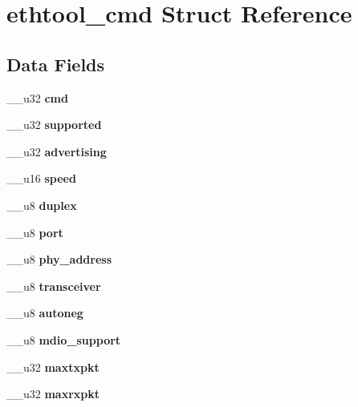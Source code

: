 \section{ethtool\-\_\-cmd \-Struct \-Reference}
\label{structethtool__cmd}
\subsection*{\-Data \-Fields}
\begin{DoxyCompactItemize}
\item 
\-\_\-\-\_\-u32 {\bfseries cmd}\label{structethtool__cmd_a66d231264d5aa36fd7d347e2c967769a}

\item 
\-\_\-\-\_\-u32 {\bfseries supported}\label{structethtool__cmd_a6e0c59f26af213bfbbdc2fb63651f5c6}

\item 
\-\_\-\-\_\-u32 {\bfseries advertising}\label{structethtool__cmd_abfaf82b26b053da93d2c5bbca6886f53}

\item 
\-\_\-\-\_\-u16 {\bfseries speed}\label{structethtool__cmd_a6dc329a74b4806dc0a14e9bcd09077dd}

\item 
\-\_\-\-\_\-u8 {\bfseries duplex}\label{structethtool__cmd_ac9065564251855cf8fe3cee72c2485c2}

\item 
\-\_\-\-\_\-u8 {\bfseries port}\label{structethtool__cmd_aacc3344d64d8bf00e8e33f831f2d4919}

\item 
\-\_\-\-\_\-u8 {\bfseries phy\-\_\-address}\label{structethtool__cmd_a106499c0afa329bfdde50e68c4b31b4b}

\item 
\-\_\-\-\_\-u8 {\bfseries transceiver}\label{structethtool__cmd_a3f860809cb8f73511013683bd6440aa6}

\item 
\-\_\-\-\_\-u8 {\bfseries autoneg}\label{structethtool__cmd_ac2d2c0904892b24c8bf1cb7310eb5b39}

\item 
\-\_\-\-\_\-u8 {\bfseries mdio\-\_\-support}\label{structethtool__cmd_a93e8ce304e0f350b1ebf861294ada202}

\item 
\-\_\-\-\_\-u32 {\bfseries maxtxpkt}\label{structethtool__cmd_a6d35e28b8854deaa9aec51a6fc4aa368}

\item 
\-\_\-\-\_\-u32 {\bfseries maxrxpkt}\label{structethtool__cmd_aa0524f3989c03f3ee7d0de5fb7e188d1}


\end{DoxyCompactItemize}
